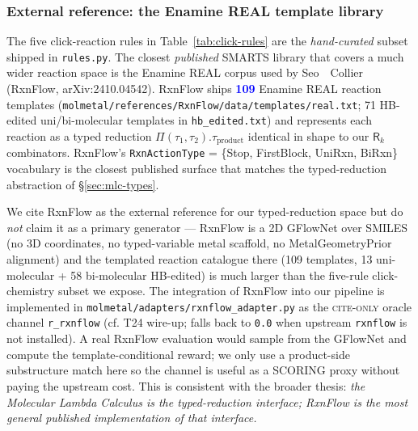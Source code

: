 \subsubsection{External reference: the Enamine REAL template library}
\label{sec:click-chem-rxnflow}

The five click-reaction rules in
Table~\ref{tab:click-rules} are the \emph{hand-curated} subset
shipped in \texttt{rules.py}. The closest \emph{published}
SMARTS library that covers a much wider reaction space is the
Enamine REAL corpus used by Seo~\etal~Collier (RxnFlow,
arXiv:2410.04542). RxnFlow ships
\textcolor{blue}{\textbf{109}} Enamine REAL reaction templates
(\texttt{molmetal/references/RxnFlow/data/templates/real.txt};
71 HB-edited uni/bi-molecular templates in
\texttt{hb\_edited.txt}) and represents each reaction as a
typed reduction $\Pi(\tau_1, \tau_2).\tau_{\text{product}}$
identical in shape to our $\mathsf{R}_{k}$ combinators.
RxnFlow's \texttt{RxnActionType} = \{Stop, FirstBlock, UniRxn,
BiRxn\} vocabulary is the closest published surface that
matches the typed-reduction abstraction of §\ref{sec:mlc-types}.

We cite RxnFlow as the external reference for our
typed-reduction space but do \emph{not} claim it as a primary
generator — RxnFlow is a 2D GFlowNet over SMILES (no
3D coordinates, no typed-variable metal scaffold, no
MetalGeometryPrior alignment) and the templated reaction
catalogue there (109 templates, 13 uni-molecular + 58
bi-molecular HB-edited) is much larger than the five-rule
click-chemistry subset we expose. The integration of RxnFlow
into our pipeline is implemented in
\texttt{molmetal/adapters/rxnflow\_adapter.py} as the
\textsc{cite-only} oracle channel
\texttt{r\_rxnflow} (cf. T24 wire-up; falls back to
\texttt{0.0} when upstream \texttt{rxnflow} is not
installed). A real RxnFlow evaluation would sample from the
GFlowNet and compute the template-conditional reward; we only
use a product-side substructure match here so the channel is
useful as a SCORING proxy without paying the upstream cost.
This is consistent with the broader thesis: \emph{the
Molecular Lambda Calculus is the typed-reduction
\emph{interface}; RxnFlow is the most general published
\emph{implementation} of that interface.}


